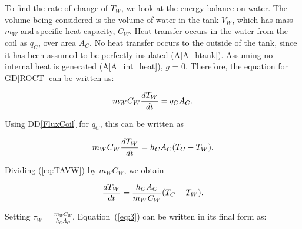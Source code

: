 \documentclass[12pt]{article}
\newcommand{\dref}[1]{GD\ref{#1}}
\newcommand{\ddref}[1]{DD\ref{#1}}
\newcommand{\aref}[1]{A\ref{#1}}
\begin{document}
To find the rate of change of $T_W$, we look at the energy balance on water.
The volume being considered is the volume of water in the tank $V_W$, which has
mass $m_W$ and specific heat capacity, $C_W$.  Heat transfer occurs in the water
from the coil as $q_C$, over area
$A_C$.  No heat transfer occurs to the outside of the
tank, since it has been assumed to be perfectly insulated (\aref{A_htank}).
Assuming no internal heat is generated (\aref{A_int_heat}), $g$ = 0.  Therefore,
the equation for \dref{ROCT} can be written as:

\begin{equation*}
\\m_W C_W \frac{dT_W}{dt} = q_C A_C.
\end{equation*}

\noindent
Using \ddref{FluxCoil} 
for $q_C$, %
this can be written as

\begin{equation}
\\m_W C_W \frac{dT_W}{dt} = h_C A_C (T_C - T_W). \label{eq:TAVW}
\end{equation}

\noindent
Dividing (\ref{eq:TAVW}) by $m_W C_W$, we obtain

\begin{equation}
\\ \frac{dT_W}{dt} = \frac{h_C A_C}{m_W C_W} (T_C - T_W).\label{eq:3}
\end{equation}

\noindent





\noindent
Setting $\tau_W = \frac{m_W C_W}{h_C A_C}$, %
Equation~(\ref{eq:3}) can be written in its final form as:
\end{document}
